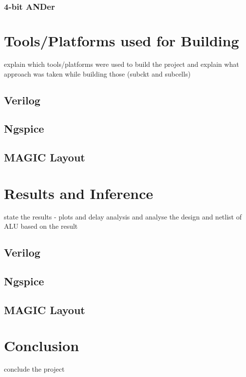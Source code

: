 \documentclass[a4paper, titlepage]{article}
\begin{document}
\subsubsection{4-bit ANDer}
\section{Tools/Platforms used for Building}
explain which tools/platforms were used to build the project
and explain what approach was taken while building those (subckt and subcells)
\subsection{Verilog}
\subsection{Ngspice}
\subsection{MAGIC Layout}
\section{Results and Inference}
state the results - plots and delay analysis and analyse the design and netlist 
of ALU based on the result 
\subsection{Verilog}
\subsection{Ngspice}
\subsection{MAGIC Layout}
\section{Conclusion}
conclude the project
\end{document}
